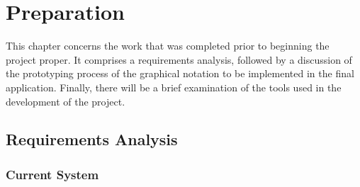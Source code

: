 \documentclass[12pt,twoside,notitlepage,xetex]{report}
\begin{document}
\cleardoublepage



\chapter{Preparation}

This chapter concerns the work that was completed prior to beginning the
project proper.  It comprises a requirements analysis, followed by a discussion
of the prototyping process of the graphical notation to be implemented in the
final application.  Finally, there will be a brief examination of the tools
used in the development of the project.

\section{Requirements Analysis}


\subsection{Current System}
\end{document}

